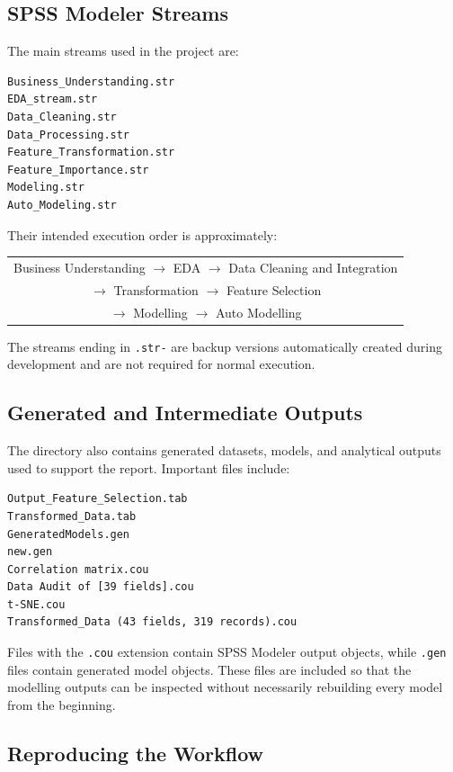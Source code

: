 \subsection{SPSS Modeler Streams}

The main streams used in the project are:

\begin{verbatim}
Business_Understanding.str
EDA_stream.str
Data_Cleaning.str
Data_Processing.str
Feature_Transformation.str
Feature_Importance.str
Modeling.str
Auto_Modeling.str
\end{verbatim}

Their intended execution order is approximately:

\begin{center}
\begin{tabular}{c}
Business Understanding $\longrightarrow$ EDA
$\longrightarrow$ Data Cleaning and Integration \\
$\longrightarrow$ Transformation $\longrightarrow$ Feature Selection \\
$\longrightarrow$ Modelling $\longrightarrow$ Auto Modelling
\end{tabular}
\end{center}

The streams ending in \texttt{.str-} are backup versions automatically
created during development and are not required for normal execution.

\subsection{Generated and Intermediate Outputs}

The directory also contains generated datasets, models, and analytical
outputs used to support the report. Important files include:

\begin{verbatim}
Output_Feature_Selection.tab
Transformed_Data.tab
GeneratedModels.gen
new.gen
Correlation matrix.cou
Data Audit of [39 fields].cou
t-SNE.cou
Transformed_Data (43 fields, 319 records).cou
\end{verbatim}

Files with the \texttt{.cou} extension contain SPSS Modeler output objects,
while \texttt{.gen} files contain generated model objects. These files are
included so that the modelling outputs can be inspected without necessarily
rebuilding every model from the beginning.

\subsection{Reproducing the Workflow}

